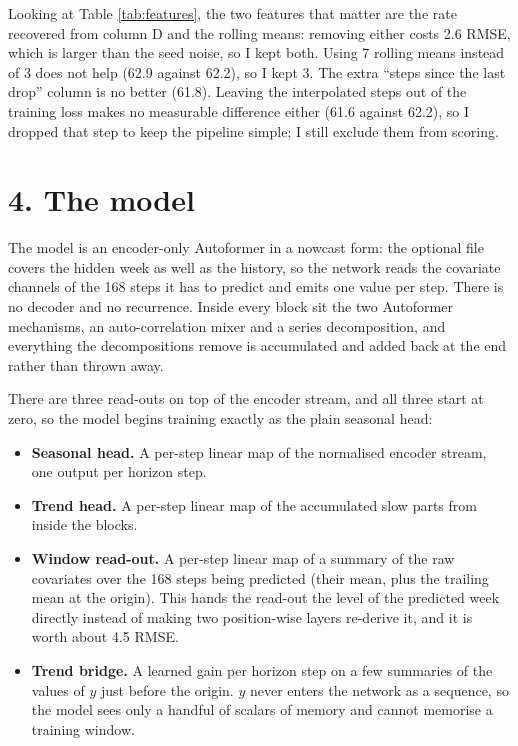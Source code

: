 \documentclass[11pt,letterpaper]{article}
\begin{document}
Looking at Table \ref{tab:features}, the two features that matter are the rate recovered from column D and the rolling means: removing either costs 2.6 RMSE, which is larger than the seed noise, so I kept both. Using 7 rolling means instead of 3 does not help (62.9 against 62.2), so I kept 3. The extra ``steps since the last drop'' column is no better (61.8). Leaving the interpolated steps out of the {training} loss makes no measurable difference either (61.6 against 62.2), so I dropped that step to keep the pipeline simple; I still exclude them from scoring.


\section*{4. The model}

The model is an {encoder-only} Autoformer in a nowcast form: the optional file covers the hidden week as well as the history, so the network reads the covariate channels of the 168 steps it has to predict and emits one value per step. There is no decoder and no recurrence. Inside every block sit the two Autoformer mechanisms, an auto-correlation mixer and a series decomposition, and everything the decompositions remove is accumulated and added back at the end rather than thrown away.

There are three read-outs on top of the encoder stream, and all three start at zero, so the model begins training exactly as the plain seasonal head:

\begin{itemize}
\item \textbf{Seasonal head.} A per-step linear map of the normalised encoder stream, one output per horizon step.
\item \textbf{Trend head.} A per-step linear map of the accumulated slow parts from inside the blocks.
\item \textbf{Window read-out.} A per-step linear map of a summary of the raw covariates over the 168 steps being predicted (their mean, plus the trailing mean at the origin). This hands the read-out the level of the predicted week directly instead of making two position-wise layers re-derive it, and it is worth about 4.5 RMSE.
\item \textbf{Trend bridge.} A learned gain per horizon step on a few summaries of the values of $y$ just before the origin. $y$ never enters the network as a sequence, so the model sees only a handful of scalars of memory and cannot memorise a training window.
\end{itemize}
\end{document}
